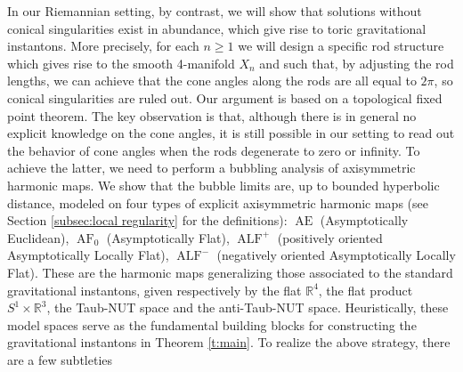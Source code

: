 \documentclass[a4paper,11pt]{amsart}
\theoremstyle{definition}
\numberwithin{equation}{section}
\newcommand{\R}{\mathbb{R}}
\DeclareMathOperator{\Ae}{AE}
\DeclareMathOperator{\ALF}{ALF}
\DeclareMathOperator{\AF}{AF}
\begin{document}
In our Riemannian setting, by contrast, we will show that solutions without conical singularities exist in abundance, which give rise to toric gravitational instantons. More precisely, for each $n\geq 1$ we will design a specific rod structure which gives rise to the smooth 4-manifold $X_n$ and such that, by adjusting the rod lengths, we can achieve that the cone angles along the rods are all equal to $2\pi$, so conical singularities are ruled out.  Our argument is based on a topological fixed point theorem.  The key observation is that, although there is in general no explicit knowledge on the cone angles, it is still possible in our setting to read out the behavior of cone angles when the rods degenerate to zero or infinity. To achieve the latter, we need to perform a bubbling analysis of axisymmetric harmonic maps. We show that the bubble limits are, up to bounded hyperbolic distance, modeled on four types of explicit axisymmetric harmonic maps (see Section \ref{subsec:local regularity} for the definitions): $\Ae$ (Asymptotically Euclidean), $\AF_0$ (Asymptotically Flat), $\ALF^+$ (positively oriented Asymptotically Locally Flat), $\ALF^-$ (negatively oriented Asymptotically Locally Flat). These are the harmonic maps generalizing those associated to the standard gravitational instantons, given respectively by the flat $\R^4$, the flat product $S^1\times \R^3$, the Taub-NUT space and the anti-Taub-NUT space. Heuristically, these model spaces serve as the fundamental building blocks for constructing the gravitational instantons in Theorem \ref{t:main}. To realize the above strategy, there are a few subtleties
\end{document}
